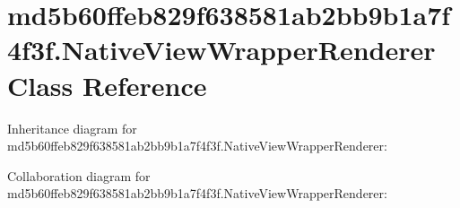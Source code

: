 \hypertarget{classmd5b60ffeb829f638581ab2bb9b1a7f4f3f_1_1_native_view_wrapper_renderer}{}\section{md5b60ffeb829f638581ab2bb9b1a7f4f3f.\+Native\+View\+Wrapper\+Renderer Class Reference}
\label{classmd5b60ffeb829f638581ab2bb9b1a7f4f3f_1_1_native_view_wrapper_renderer}


Inheritance diagram for md5b60ffeb829f638581ab2bb9b1a7f4f3f.\+Native\+View\+Wrapper\+Renderer\+:


Collaboration diagram for md5b60ffeb829f638581ab2bb9b1a7f4f3f.\+Native\+View\+Wrapper\+Renderer\+:
